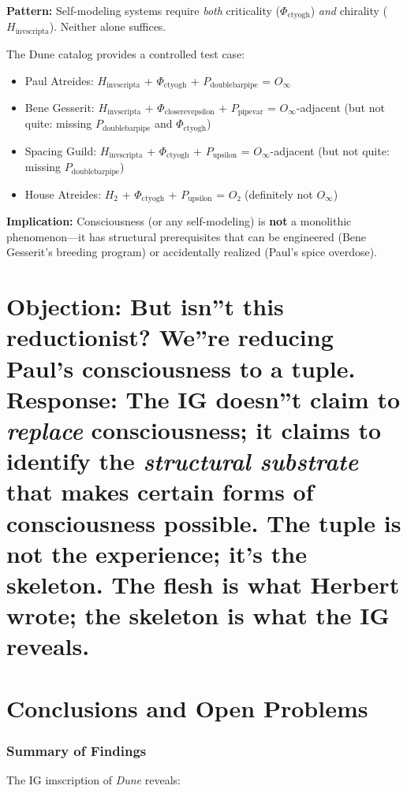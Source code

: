 \documentclass[12pt,a4paper]{article}
\begin{document}
\textbf{Pattern:} Self-modeling systems require \emph{both} criticality ($\Phi_{\text{ctyogh}}$) \emph{and} chirality ($H_{\text{invscripta}}$). Neither alone suffices.

The Dune catalog provides a controlled test case:

\begin{itemize}
    \item Paul Atreides: $H_{\text{invscripta}}$ + $\Phi_{\text{ctyogh}}$ + $P_{\text{doublebarpipe}}$ = $O_{\infty}$ 
    \item Bene Gesserit: $H_{\text{invscripta}}$ + $\Phi_{\text{closerevepsilon}}$ + $P_{\text{pipevar}}$ = $O_{\infty}$-adjacent (but not quite: missing $P_{\text{doublebarpipe}}$ and $\Phi_{\text{ctyogh}}$)
    \item Spacing Guild: $H_{\text{invscripta}}$ + $\Phi_{\text{ctyogh}}$ + $P_{\text{upsilon}}$ = $O_{\infty}$-adjacent (but not quite: missing $P_{\text{doublebarpipe}}$)
    \item House Atreides: $H_2$ + $\Phi_{\text{ctyogh}}$ + $P_{\text{upsilon}}$ = $O₂$ (definitely not $O_{\infty}$)
\end{itemize}

\textbf{Implication:} Consciousness (or any self-modeling) is \textbf{not} a monolithic phenomenon---it has structural prerequisites that can be engineered (Bene Gesserit's breeding program) or accidentally realized (Paul's spice overdose).

\part{\textbf{Objection:} But isn''t this reductionist? We''re reducing Paul's consciousness to a tuple. Response: The IG doesn''t claim to \emph{replace} consciousness; it claims to identify the \emph{structural substrate} that makes certain forms of consciousness possible. The tuple is not the experience; it's the skeleton. The flesh is what Herbert wrote; the skeleton is what the IG reveals.}

\part{Conclusions and Open Problems}

\section{Summary of Findings}

The IG imscription of \emph{Dune} reveals:
\end{document}
